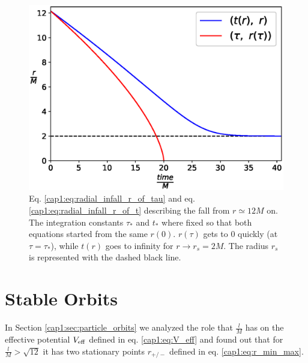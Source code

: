 \begin{figure}[h]
    \centering
    \includegraphics[width = 0.8 \textwidth]{Figures/radial_infall.eps}
    \caption{Eq. \ref{cap1:eq:radial_infall_r_of_tau} and eq.
    \ref{cap1:eq:radial_infall_r_of_t} describing the fall from
    $r \simeq 12M$ on.
    The integration constants $\tau_*$ and $t_*$ where fixed so that both
    equations started from the same $r(0)$.
    $r(\tau)$ gets to 0 quickly (at $\tau = \tau_*$), while $t(r)$ goes to
    infinity for $r \rightarrow r_s = 2M$. The \Sh radius $r_s$ is represented
    with the dashed black line.}
    \label{cap1:fig:radial_infall}

\end{figure}

\newpage


\section{Stable Orbits}
\label{cap1:sec:stable_orbits}

In Section \ref{cap1:sec:particle_orbits} we analyzed the role that
$\frac{l}{M}$ has on the effective potential $V_{\rm eff}$ defined in eq.
\ref{cap1:eq:V_eff} and found out that for $\frac{l}{M} > \sqrt{12}$ it has two
stationary points $r_{+ / -}$ defined in eq. \ref{cap1:eq:r_min_max}.

